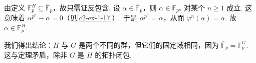 \begin{example}
\begin{enumerate}
    由定义 $\mathbb{F}_p^{H}\subseteq\overline{\mathbb{F}}_p$，故只需证反包含. 设 $\alpha\in\overline{\mathbb{F}}_p$，则 $\alpha\in\mathbb{F}_{p^{n}}$ 对某个 $n\geq 1$ 成立. 这意味着 $\alpha^{p^{n}}-\alpha=0$（见\autoref{c2-ex-1-17}）. 于是 $\alpha^{p^{n}}=\alpha$，从而 $\varphi^{n}(\alpha)=\alpha$. 故 $\alpha\in\mathbb{F}_p^{H}$.
\end{enumerate}
我们得出结论：$H$ 与 $G$ 是两个不同的群，但它们的固定域相同，因为 $\overline{\mathbb{F}}_p=\mathbb{F}_p^{G}$. 这与定理矛盾，除非 $G$ 是 $H$ 的拓扑闭包.
\end{example}
